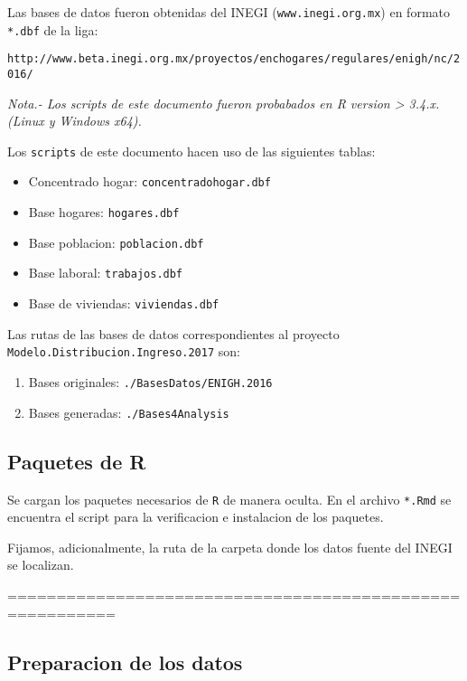 \documentclass[11pt,]{article}
\begin{document}
Las bases de datos fueron obtenidas del INEGI
(\texttt{www.inegi.org.mx}) en formato \texttt{*.dbf} de la liga:

\texttt{http://www.beta.inegi.org.mx/proyectos/enchogares/regulares/enigh/nc/2016/}

\emph{Nota.- Los scripts de este documento fueron probabados en R
version \textgreater{} 3.4.x. (Linux y Windows x64).}

Los \texttt{scripts} de este documento hacen uso de las siguientes
tablas:

\begin{itemize}
\item
  Concentrado hogar: \texttt{concentradohogar.dbf}
\item
  Base hogares: \texttt{hogares.dbf}
\item
  Base poblacion: \texttt{poblacion.dbf}
\item
  Base laboral: \texttt{trabajos.dbf}
\item
  Base de viviendas: \texttt{viviendas.dbf}
\end{itemize}

Las rutas de las bases de datos correspondientes al proyecto
\texttt{Modelo.Distribucion.Ingreso.2017} son:

\begin{enumerate}
\def\labelenumi{\arabic{enumi}.}
\item
  Bases originales: \texttt{./BasesDatos/ENIGH.2016}
\item
  Bases generadas: \texttt{./Bases4Analysis}
\end{enumerate}

\subsection{Paquetes de R}\label{paquetes-de-r}

Se cargan los paquetes necesarios de \texttt{R} de manera oculta. En el
archivo \texttt{*.Rmd} se encuentra el script para la verificacion e
instalacion de los paquetes.

Fijamos, adicionalmente, la ruta de la carpeta donde los datos fuente
del INEGI se localizan.

=========================================================

\subsection{Preparacion de los datos}\label{preparacion-de-los-datos}
\end{document}

